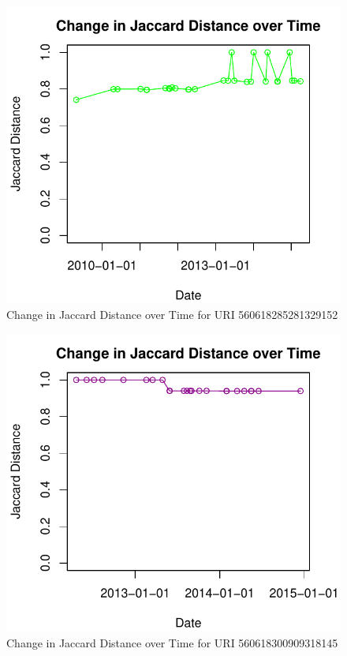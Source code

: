 \documentclass[a4paper,12pt]{article}
\begin{document}
\begin{figure}[H]
    \centering
    \includegraphics{stats/q3/560618285281329152.pdf}
    \caption{Change in Jaccard Distance over Time for URI 560618285281329152}
\end{figure}

\begin{figure}[H]
    \centering
    \includegraphics{stats/q3/560618300909318145.pdf}
    \caption{Change in Jaccard Distance over Time for URI 560618300909318145}
\end{figure}
\end{document}
